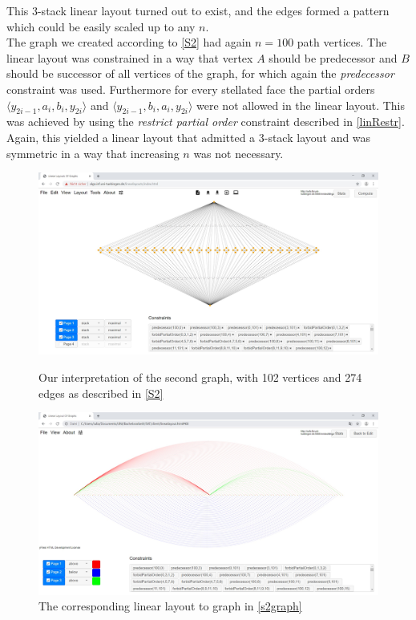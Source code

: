 \noindent This 3-stack linear layout turned out to exist, and the edges formed a pattern which could be easily scaled up to any $n$.\\[12pt]
The graph we created according to \autoref{S2} had again $n = 100$ path vertices. The linear layout was constrained in a way that vertex $A$ should be predecessor and $B$ should be successor of all vertices of the graph, for which again the \textit{predecessor} constraint was used. Furthermore for every stellated face the partial orders $\langle y_{2i-1}, a_i, b_i, y_{2i}\rangle$ and $\langle y_{2i-1}, b_i, a_i, y_{2i}\rangle$ were not allowed in the linear layout. This was achieved by using the \textit{restrict partial order} constraint described in \autoref{linRestr}.\\
Again, this yielded a linear layout that admitted a 3-stack layout and was symmetric in a way that increasing $n$ was not necessary.\\
\begin{figure}[h!]
\begin{center}
\includegraphics[width=1\textwidth]{figures/stellated-102-274.jpg}
\caption{Our interpretation of the second graph, with 102 vertices and 274 edges as described in \autoref{S2} \label{s2graph}}
\vspace*{24pt}
\includegraphics[width=1\textwidth]{figures/stellated-102-274-Solution.jpg}
\caption{The corresponding linear layout to graph in \autoref{s2graph} \label{s2Sol}}
\end{center}
\end{figure}\\
